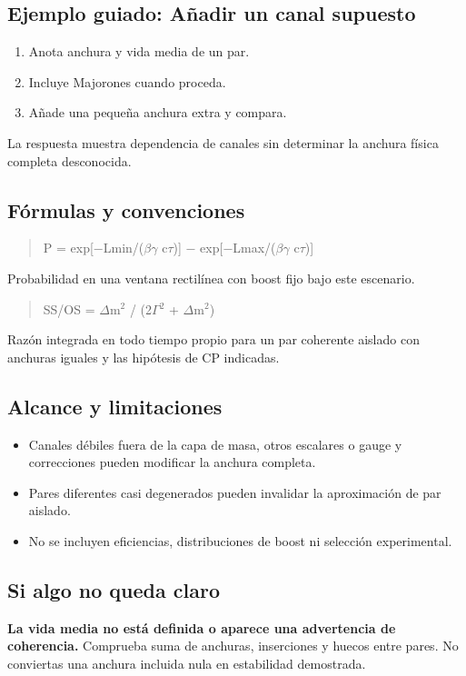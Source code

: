 \documentclass[11pt,a4paper]{article}
\begin{document}
\subsection*{Ejemplo guiado: Añadir un canal supuesto}
\begin{enumerate}
\item Anota anchura y vida media de un par.
\item Incluye Majorones cuando proceda.
\item Añade una pequeña anchura extra y compara.
\end{enumerate}
La respuesta muestra dependencia de canales sin determinar la anchura física completa desconocida.
\subsection*{Fórmulas y convenciones}
\begin{quote}P = exp[\ensuremath{-}Lmin/(\ensuremath{\beta}\ensuremath{\gamma} c\ensuremath{\tau})] \ensuremath{-} exp[\ensuremath{-}Lmax/(\ensuremath{\beta}\ensuremath{\gamma} c\ensuremath{\tau})]\end{quote}
Probabilidad en una ventana rectilínea con boost fijo bajo este escenario.

\begin{quote}SS/OS = \ensuremath{\Delta}m\ensuremath{{}^{2}} / (2\ensuremath{\Gamma}\ensuremath{{}^{2}} + \ensuremath{\Delta}m\ensuremath{{}^{2}})\end{quote}
Razón integrada en todo tiempo propio para un par coherente aislado con anchuras iguales y las hipótesis de CP indicadas.

\subsection*{Alcance y limitaciones}
\begin{itemize}
\item Canales débiles fuera de la capa de masa, otros escalares o gauge y correcciones pueden modificar la anchura completa.
\item Pares diferentes casi degenerados pueden invalidar la aproximación de par aislado.
\item No se incluyen eficiencias, distribuciones de boost ni selección experimental.
\end{itemize}
\subsection*{Si algo no queda claro}
\textbf{La vida media no está definida o aparece una advertencia de coherencia.} Comprueba suma de anchuras, inserciones y huecos entre pares. No conviertas una anchura incluida nula en estabilidad demostrada.
\end{document}
